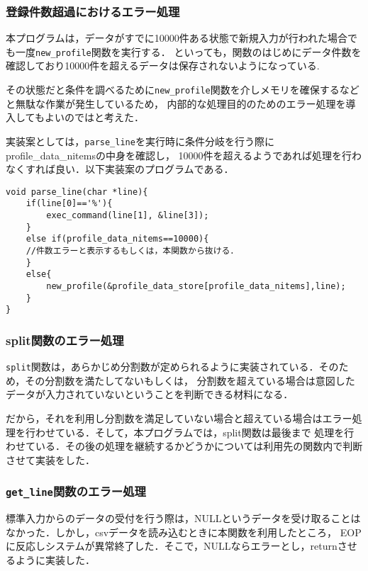 \documentclass[a4j,11pt]{jarticle}
\begin{document}
\subsubsection{登録件数超過におけるエラー処理}
本プログラムは，データがすでに10000件ある状態で新規入力が行われた場合でも一度\verb|new_profile|関数を実行する．
といっても，関数のはじめにデータ件数を確認しており10000件を超えるデータは保存されないようになっている.

その状態だと条件を調べるために\verb|new_profile|関数を介しメモリを確保するなどと無駄な作業が発生しているため，
内部的な処理目的のためのエラー処理を導入してもよいのではと考えた．

実装案としては，\verb|parse_line|を実行時に条件分岐を行う際にprofile\_data\_nitemsの中身を確認し，
10000件を超えるようであれば処理を行わなくすれば良い．以下実装案のプログラムである．
\begin{verbatim}
void parse_line(char *line){
    if(line[0]=='%'){
        exec_command(line[1], &line[3]);
    }
    else if(profile_data_nitems==10000){
    //件数エラーと表示するもしくは，本関数から抜ける．
    }
    else{
        new_profile(&profile_data_store[profile_data_nitems],line);
    }
}
\end{verbatim}
\subsubsection{split関数のエラー処理}
\verb|split|関数は，あらかじめ分割数が定められるように実装されている．そのため，その分割数を満たしてないもしくは，
分割数を超えている場合は意図したデータが入力されていないということを判断できる材料になる．

だから，それを利用し分割数を満足していない場合と超えている場合はエラー処理を行わせている．そして，本プログラムでは，split関数は最後まで
処理を行わせている．その後の処理を継続するかどうかについては利用先の関数内で判断させて実装をした．

\subsubsection{\texttt{get\_line}関数のエラー処理}
標準入力からのデータの受付を行う際は，NULLというデータを受け取ることはなかった．しかし，csvデータを読み込むときに本関数を利用したところ，
EOPに反応しシステムが異常終了した．そこで，NULLならエラーとし，returnさせるように実装した．
\end{document}
